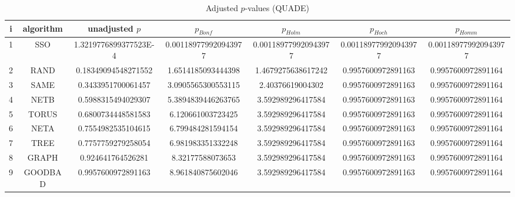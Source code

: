 \documentclass[a4paper,10pt]{article}
\begin{document}
\begin{landscape}
\begin{table}[!htp]
\centering\scriptsize
\caption{Adjusted $p$-values (QUADE)}
\begin{tabular}{ccccccc}
i&algorithm&unadjusted $p$&$p_{Bonf}$&$p_{Holm}$&$p_{Hoch}$&$p_{Homm}$\\
\hline
1& SSO&1.3219776899377523E-4&0.001189779920943977&0.001189779920943977&0.001189779920943977&0.001189779920943977\\
2& RAND&0.18349094548271552&1.6514185093444398&1.4679275638617242&0.9957600972891163&0.9957600972891164\\
3& SAME&0.3433951700061457&3.0905565300553115&2.40376619004302&0.9957600972891163&0.9957600972891164\\
4& NETB&0.5988315494029307&5.3894839446263765&3.592989296417584&0.9957600972891163&0.9957600972891164\\
5& TORUS&0.6800734448581583&6.120661003723425&3.592989296417584&0.9957600972891163&0.9957600972891164\\
6& NETA&0.7554982535104615&6.799484281594154&3.592989296417584&0.9957600972891163&0.9957600972891164\\
7& TREE&0.7757759279258054&6.981983351332248&3.592989296417584&0.9957600972891163&0.9957600972891164\\
8& GRAPH&0.924641764526281&8.32177588073653&3.592989296417584&0.9957600972891163&0.9957600972891164\\
9& GOODBAD&0.9957600972891163&8.961840875602046&3.592989296417584&0.9957600972891163&0.9957600972891164\\
\hline
\end{tabular}
\end{table}


\end{landscape}
\end{document}
